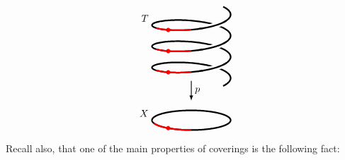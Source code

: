 \begin{equation*}
\begin{tikzpicture}[scale=1,
    d1/.style= {postaction={decorate}, decoration={markings, mark=at position 0.2 with {\arrow{stealth}}}},
]

\def\a{1.4}
\def\b{0.35}
\def\c{0.12}

\draw[line width=1.6pt,  domain= {-0.2*pi}:{6.2*pi}, samples=500] 
 plot ({\a*cos(deg(\x))}, {\b*sin(deg(\x)) + \c*\x} );

\foreach \s in {1, 3, 5}{
\draw[line width = 5.6pt, white, domain= {{(\s + 0.6)*pi}}:{{(\s + 0.8)*pi}}, samples=100]
 plot ({\a*cos(deg(\x))}, {\b*sin(deg(\x)) + \c*\x} );
\draw[line width = 1.6pt, domain= {{(\s + 0.55)*pi}}:{{(\s + 0.85)*pi}}, samples=100]
 plot ({\a*cos(deg(\x))}, {\b*sin(deg(\x)) + \c*\x} );
 }
  
\foreach \s in {1, 3, 5}{
\draw[line width = 1.6pt, red, domain= {{(\s + 0.15)*pi}}:{{(\s + 0.5)*pi}}, samples=100]
 plot ({\a*cos(deg(\x))}, {\b*sin(deg(\x)) + \c*\x} );
}
\foreach \s in {1, 3, 5}{
\coordinate (X) at ({\a*cos(deg((\s + 0.3)*pi))}, 
{\b*sin(deg((\s + 0.3)*pi)) + \c*((\s + 0.3)*pi)});
\filldraw[red] (X) circle (0.07);
}

\node[anchor=south east] at ({\a*cos(deg(5*pi))}, {\b*sin(deg(5*pi)) + \c*5*pi}) {$T$};

\draw[thick, ->, >=latex] (0.0, -0.1) -- node[anchor=west] {$p$} (0.0, -0.8);

\draw[line width=1.6pt,  domain= {0}:{2*pi}, samples=500] 
 plot ({\a*cos(deg(\x))}, {\b*sin(deg(\x)) - 1.5});
\draw[line width = 1.6pt, red, domain= {{(1 + 0.1)*pi}}:{{(1 + 0.5)*pi}}, samples=100]
 plot ({\a*cos(deg(\x))}, {\b*sin(deg(\x)) - 1.5});
\coordinate (X) at ({\a*cos(deg(1.3*pi))}, {\b*sin(deg(1.3*pi)) - 1.5});
\filldraw[red] (X) circle (0.07);

\node[anchor=south east] at ({\a*cos(deg(pi))}, {\b*sin(deg(pi)) - 1.5}) {$X$};
\end{tikzpicture}
\end{equation*}



Recall also, that one of the main properties of coverings is the following fact: 

